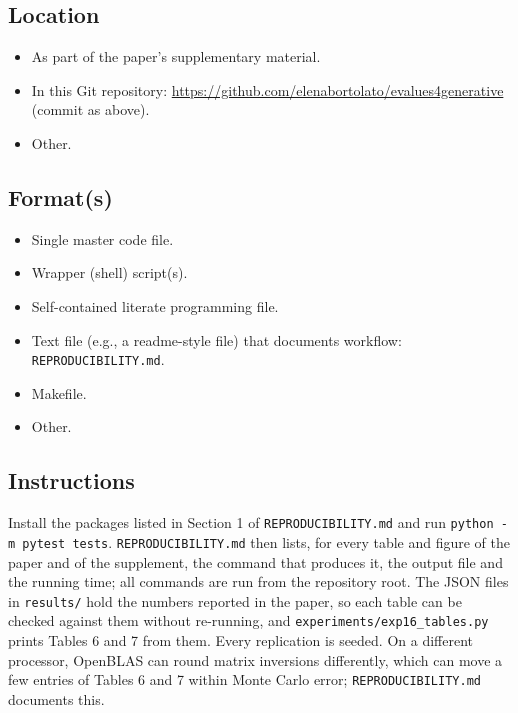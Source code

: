 \documentclass[11pt]{article}
\providecommand{\tightlist}{\setlength{\itemsep}{0pt}\setlength{\parskip}{0pt}}
\begin{document}
\hypertarget{location}{%
\subsection{Location}\label{location}}

\begin{itemize}
\tightlist
\item[$\square$]
  As part of the paper's supplementary material.
\item[$\boxtimes$]
  In this Git repository:
  \url{https://github.com/elenabortolato/evalues4generative} (commit as
  above).
\item[$\square$]
  Other.
\end{itemize}

\hypertarget{formats}{%
\subsection{Format(s)}\label{formats}}

\begin{itemize}
\tightlist
\item[$\square$]
  Single master code file.
\item[$\square$]
  Wrapper (shell) script(s).
\item[$\square$]
  Self-contained literate programming file.
\item[$\boxtimes$]
  Text file (e.g., a readme-style file) that documents workflow:
  \texttt{REPRODUCIBILITY.md}.
\item[$\square$]
  Makefile.
\item[$\square$]
  Other.
\end{itemize}

\hypertarget{instructions}{%
\subsection{Instructions}\label{instructions}}

Install the packages listed in Section 1 of \texttt{REPRODUCIBILITY.md}
and run \texttt{python\ -m\ pytest\ tests}. \texttt{REPRODUCIBILITY.md}
then lists, for every table and figure of the paper and of the
supplement, the command that produces it, the output file and the
running time; all commands are run from the repository root. The JSON
files in \texttt{results/} hold the numbers reported in the paper, so
each table can be checked against them without re-running, and
\texttt{experiments/exp16\_tables.py} prints Tables 6 and 7 from them.
Every replication is seeded. On a different processor, OpenBLAS can
round matrix inversions differently, which can move a few entries of
Tables 6 and 7 within Monte Carlo error; \texttt{REPRODUCIBILITY.md}
documents this.
\end{document}
